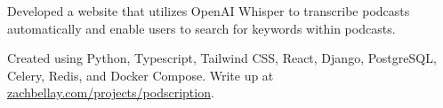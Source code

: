 \documentclass[]{deedy-resume-openfont}
\begin{document}
\hfill{}
\begin{tightemize}
\item Developed a website that utilizes OpenAI Whisper to transcribe podcasts automatically and enable users to search for keywords within podcasts.
\item Created using Python, Typescript, Tailwind CSS, React, Django, PostgreSQL, Celery, Redis, and Docker Compose. Write up at \href{https://zachbellay.com/projects/podscription}{zachbellay.com/projects/podscription}.
\end{tightemize}
\sectionsep







\end{document}
